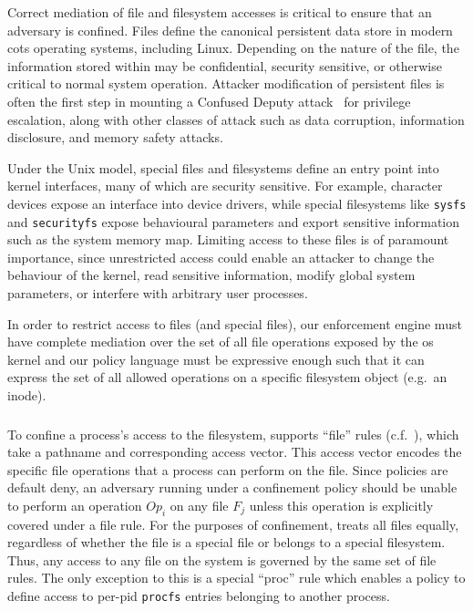 Correct mediation of file and filesystem accesses is critical to ensure that an adversary
is confined. Files define the canonical persistent data store in modern \gls{cots}
operating systems, including Linux. Depending on the nature of the file, the information
stored within may be confidential, security sensitive, or otherwise critical to normal
system operation. Attacker modification of persistent files is often the first step in
mounting a Confused Deputy attack~\cite{hardy1988_confused_deputy} for privilege
escalation, along with other classes of attack such as data corruption, information
disclosure, and memory safety attacks.

Under the Unix model, special files and filesystems define an entry point into kernel
interfaces, many of which are security sensitive. For example, character devices expose an
interface into device drivers, while special filesystems like \texttt{sysfs} and
\texttt{securityfs} expose behavioural parameters and export sensitive information such as
the system memory map. Limiting access to these files is of paramount importance, since
unrestricted access could enable an attacker to change the behaviour of the kernel, read
sensitive information, modify global system parameters, or interfere with arbitrary user
processes.

In order to restrict access to files (and special files), our enforcement engine must have
complete mediation over the set of all file operations exposed by the \gls{os} kernel and
our policy language must be expressive enough such that it can express the set of all
allowed operations on a specific filesystem object (e.g.\ an inode).

\subsubsection{\bpfbox{}}

To confine a process's access to the filesystem, \bpfbox{} supports \enquote{file} rules
(c.f.\ ), which take a pathname and corresponding access
vector. This access vector encodes the specific file operations that a process can perform
on the file. Since \bpfbox{} policies are default deny, an adversary running under
a \bpfbox{} confinement policy should be unable to perform an operation $Op_i$ on any file
$F_j$ unless this operation is explicitly covered under a file rule. For the purposes of
confinement, \bpfbox{} treats all files equally, regardless of whether the file is
a special file or belongs to a special filesystem. Thus, any access to any file on the
system is governed by the same set of file rules. The only exception to this is a special
\enquote{proc} rule which enables a policy to define access to per-pid \texttt{procfs}
entries belonging to another process.

